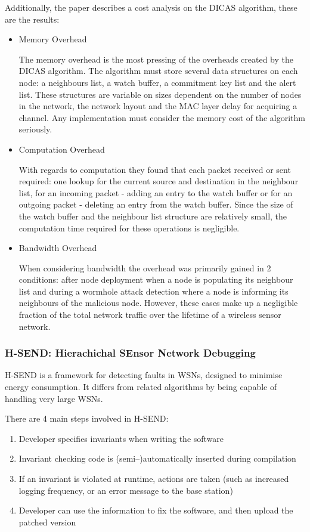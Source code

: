 Additionally, the paper describes a cost analysis on the DICAS algorithm, these are the results: 
\begin{itemize}
\item Memory Overhead

The memory overhead is the most pressing of the overheads created by the DICAS algorithm. The algorithm must store several data structures on each node: a neighbours list, a watch buffer, a commitment key list and the alert list. These structures are variable on sizes dependent on the number of nodes in the network, the network layout and the MAC layer delay for acquiring a channel. Any implementation must consider the memory cost of the algorithm seriously.

\item Computation Overhead

With regards to computation they found that each packet received or sent required: one lookup for the current source and destination in the neighbour list, for an incoming packet - adding an entry to the watch buffer or for an outgoing packet - deleting an entry from the watch buffer. Since the size of the watch buffer and the neighbour list structure are relatively small, the computation time required for these operations is negligible.

\item Bandwidth Overhead

When considering bandwidth the overhead was primarily gained in 2 conditions: after node deployment when a node is populating its neighbour list and during a wormhole attack detection where a node is informing its neighbours of the malicious node. However, these cases make up a negligible fraction of the total network traffic over the lifetime of a wireless sensor network.
\end{itemize}

\subsubsection*{H-SEND: Hierachichal SEnsor Network Debugging}

H-SEND is a framework for detecting faults in WSNs, designed to minimise energy consumption. It differs from related algorithms by being capable of handling very large WSNs. \cite{herbert2007adaptive}

There are 4 main steps involved in H-SEND:

\begin{enumerate}
	\item Developer specifies invariants when writing the software
	\item Invariant checking code is (semi--)automatically inserted during compilation
	\item If an invariant is violated at runtime, actions are taken (such as increased logging frequency, or an error message to the base station)
	\item Developer can use the information to fix the software, and then upload the patched version
\end{enumerate}

